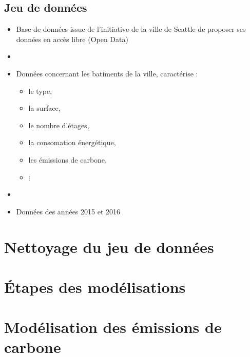 \documentclass[8pt,aspectratio=169,hyperref={unicode=true}]{beamer}
\begin{document}
\subsection{Jeu de données}
\begin{frame}{\insertsubsection}
  \begin{itemize}
    \item Base de données issue de l'initiative de la ville de Seattle de proposer ses
          données en accès libre (Open Data)
    \item[]
    \item Données concernant les batiments de la ville, caractérise :
          \begin{itemize}
            \item le type,
            \item la surface,
            \item le nombre d'étages,
            \item la consomation énergétique,
            \item les émissions de carbone,
            \item $\vdots$
          \end{itemize}
    \item[]
    \item Données des années 2015 et 2016
  \end{itemize}
\end{frame}

\section{Nettoyage du jeu de données}
\begin{frame}{\insertsection}

\end{frame}
\section{Étapes des modélisations}
\begin{frame}{\insertsection}

\end{frame}

\section[Modélisation émissions]{Modélisation des émissions de carbone}
\end{document}
